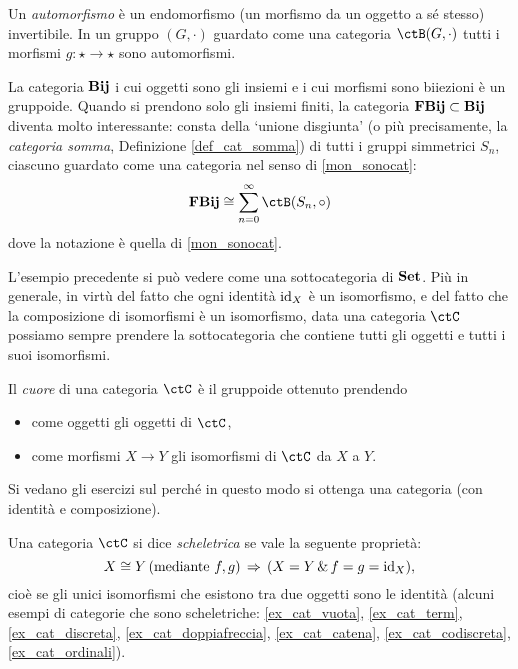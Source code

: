 \begin{definition}
	Un \emph{automorfismo} è un endomorfismo (un morfismo da un oggetto a sé stesso) invertibile. In un gruppo \((G,\cdot)\) guardato come una categoria \(\ctB(G,\cdot)\) tutti i morfismi \(g : \star\to\star\) sono automorfismi.
\end{definition}

\begin{example}
	La categoria \(\mathbf{Bij}\) i cui oggetti sono gli insiemi e i cui morfismi sono biiezioni è un gruppoide. Quando si prendono solo gli insiemi finiti, la categoria \(\mathbf{FBij}\subset\mathbf{Bij}\) diventa molto interessante: consta della `unione disgiunta' (o più precisamente, la \emph{categoria somma}, Definizione \ref{def_cat_somma}) di tutti i gruppi simmetrici \(S_n\), ciascuno guardato come una categoria nel senso di \ref{mon_sonocat}:
	\[\cate{FBij}\cong \sum_{n=0}^\infty \ctB(S_n,\cmp)\]
	dove la notazione è quella di \ref{mon_sonocat}.
\end{example}

L'esempio precedente si può vedere come una sottocategoria di \(\mathbf{Set}\).
Più in generale, in virtù del fatto che ogni identità \(\mathrm{id}_X\) è un isomorfismo, e del fatto che la composizione di isomorfismi è un isomorfismo, data una categoria \(\ctC\) possiamo sempre prendere la sottocategoria che contiene tutti gli oggetti e tutti i suoi isomorfismi.
\begin{definition}\label{def_cuore}
	Il \emph{cuore} di una categoria \(\ctC\) è il gruppoide ottenuto prendendo
	\begin{itemize}
		\item come oggetti gli oggetti di \(\ctC\),
		\item come morfismi \(X\to Y\) gli isomorfismi di \(\ctC\) da \(X\) a \(Y\).
	\end{itemize}
\end{definition}

Si vedano gli esercizi sul perché in questo modo si ottenga una categoria (con identità e composizione).
\begin{example}\label{mongruppi_liberi}
\end{example}
\begin{definition}\label{def_cat_scheletrica}
	Una categoria \(\ctC\) si dice \emph{scheletrica} se vale la seguente proprietà:
	\[X\cong Y \, (\text{mediante } f,g) \,\Rightarrow\, (X=Y \,\&\, f=g=\mathrm{id}_X),\]
	cioè se gli unici isomorfismi che esistono tra due oggetti sono le identità (alcuni esempi di categorie che sono scheletriche: \ref{ex_cat_vuota}, \ref{ex_cat_term}, \ref{ex_cat_discreta}, \ref{ex_cat_doppiafreccia}, \ref{ex_cat_catena}, \ref{ex_cat_codiscreta}, \ref{ex_cat_ordinali}).
\end{definition}

